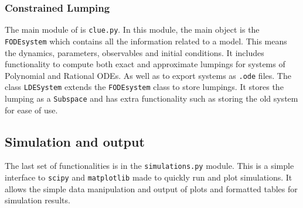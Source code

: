 \subsubsection{Constrained Lumping}
The main module of \ToolName is \texttt{clue.py}.
In this module, the main object is the \texttt{FODEsystem} which contains all the information related to a model. 
This means the dynamics, parameters, observables and initial conditions.
It includes functionality to compute both exact and approximate lumpings for systems of Polynomial and Rational ODEs.
As well as to export systems as \texttt{.ode} files.
The class \texttt{LDESystem} extends the \texttt{FODEsystem} class to store lumpings. 
It stores the lumping as a \texttt{Subspace} and has extra functionality such as storing the old system for ease of use. 


\subsection{Simulation and output}
The last set of functionalities is in the \texttt{simulations.py} module.
This is a simple interface to \texttt{scipy} and \texttt{matplotlib} made to quickly run and plot simulations. 
It allows the simple data manipulation and output of plots and formatted tables for simulation results.

